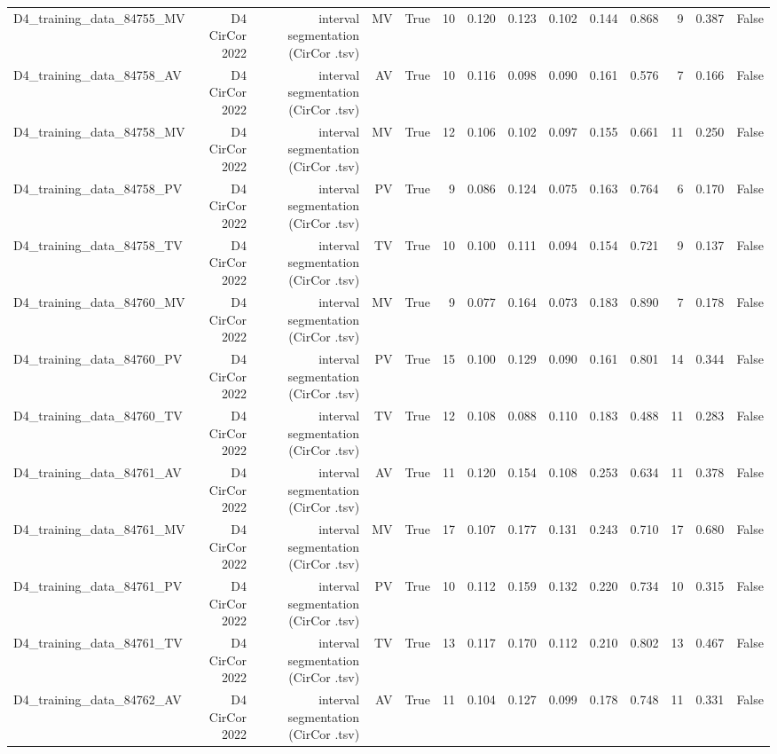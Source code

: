 \begin{table}[htbp]
\begin{tabular}{lrrrrrrrrrrrrr}
    D4\_training\_data\_84755\_MV & D4 CirCor 2022 & interval segmentation (CirCor .tsv) & MV & True & 10 & 0.120 & 0.123 & 0.102 & 0.144 & 0.868 & 9 & 0.387 & False \\
    D4\_training\_data\_84758\_AV & D4 CirCor 2022 & interval segmentation (CirCor .tsv) & AV & True & 10 & 0.116 & 0.098 & 0.090 & 0.161 & 0.576 & 7 & 0.166 & False \\
    D4\_training\_data\_84758\_MV & D4 CirCor 2022 & interval segmentation (CirCor .tsv) & MV & True & 12 & 0.106 & 0.102 & 0.097 & 0.155 & 0.661 & 11 & 0.250 & False \\
    D4\_training\_data\_84758\_PV & D4 CirCor 2022 & interval segmentation (CirCor .tsv) & PV & True & 9 & 0.086 & 0.124 & 0.075 & 0.163 & 0.764 & 6 & 0.170 & False \\
    D4\_training\_data\_84758\_TV & D4 CirCor 2022 & interval segmentation (CirCor .tsv) & TV & True & 10 & 0.100 & 0.111 & 0.094 & 0.154 & 0.721 & 9 & 0.137 & False \\
    D4\_training\_data\_84760\_MV & D4 CirCor 2022 & interval segmentation (CirCor .tsv) & MV & True & 9 & 0.077 & 0.164 & 0.073 & 0.183 & 0.890 & 7 & 0.178 & False \\
    D4\_training\_data\_84760\_PV & D4 CirCor 2022 & interval segmentation (CirCor .tsv) & PV & True & 15 & 0.100 & 0.129 & 0.090 & 0.161 & 0.801 & 14 & 0.344 & False \\
    D4\_training\_data\_84760\_TV & D4 CirCor 2022 & interval segmentation (CirCor .tsv) & TV & True & 12 & 0.108 & 0.088 & 0.110 & 0.183 & 0.488 & 11 & 0.283 & False \\
    D4\_training\_data\_84761\_AV & D4 CirCor 2022 & interval segmentation (CirCor .tsv) & AV & True & 11 & 0.120 & 0.154 & 0.108 & 0.253 & 0.634 & 11 & 0.378 & False \\
    D4\_training\_data\_84761\_MV & D4 CirCor 2022 & interval segmentation (CirCor .tsv) & MV & True & 17 & 0.107 & 0.177 & 0.131 & 0.243 & 0.710 & 17 & 0.680 & False \\
    D4\_training\_data\_84761\_PV & D4 CirCor 2022 & interval segmentation (CirCor .tsv) & PV & True & 10 & 0.112 & 0.159 & 0.132 & 0.220 & 0.734 & 10 & 0.315 & False \\
    D4\_training\_data\_84761\_TV & D4 CirCor 2022 & interval segmentation (CirCor .tsv) & TV & True & 13 & 0.117 & 0.170 & 0.112 & 0.210 & 0.802 & 13 & 0.467 & False \\
    D4\_training\_data\_84762\_AV & D4 CirCor 2022 & interval segmentation (CirCor .tsv) & AV & True & 11 & 0.104 & 0.127 & 0.099 & 0.178 & 0.748 & 11 & 0.331 & False \\

\end{tabular}
\end{table}
